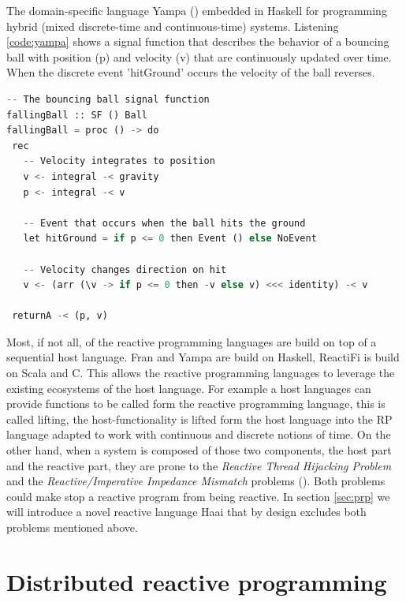 \documentclass[a4paper]{book}
\begin{document}
The domain-specific language Yampa (\cite{DBLP:conf/haskell/CourtneyNP03}) embedded in Haskell for programming hybrid (mixed discrete-time and continuous-time) systems. Listening \ref{code:yampa} shows a signal function that describes the behavior of a bouncing ball with position (p) and velocity (v) that are continuously updated over time. When the discrete event 'hitGround' occurs the velocity of the ball reverses.
\begin{lstlisting}[language=Python, caption={Yampa, bouncing ball},captionpos=b, label={code:yampa}, basicstyle=\small\ttfamily, frame=single]
-- The bouncing ball signal function
fallingBall :: SF () Ball
fallingBall = proc () -> do
 rec
   -- Velocity integrates to position
   v <- integral -< gravity
   p <- integral -< v

   -- Event that occurs when the ball hits the ground
   let hitGround = if p <= 0 then Event () else NoEvent
	
   -- Velocity changes direction on hit
   v <- (arr (\v -> if p <= 0 then -v else v) <<< identity) -< v

 returnA -< (p, v)
\end{lstlisting}


Most, if not all, of the reactive programming languages are build on top of a sequential host language. Fran and Yampa are build on Haskell, ReactiFi is build on Scala and C. This allows the reactive programming languages to leverage the existing ecosystems of the host language. For example a host languages can provide functions to be called form the reactive programming language, this is called lifting, the host-functionality is lifted form the host language into the RP language adapted to work with continuous and discrete notions of time. On the other hand, when a system is composed of those two components, the host part and the reactive part, they are prone to the \textit{Reactive Thread Hijacking Problem} and the \textit{Reactive/Imperative Impedance Mismatch} problems (\cite{vonder_tackling_2020}). Both problems could make stop a reactive program from being reactive. In section \ref{sec:prp} we will introduce a novel reactive language Haai that by design excludes both problems mentioned above.  



\section{Distributed reactive programming} \label{sec:drp}
\end{document}
